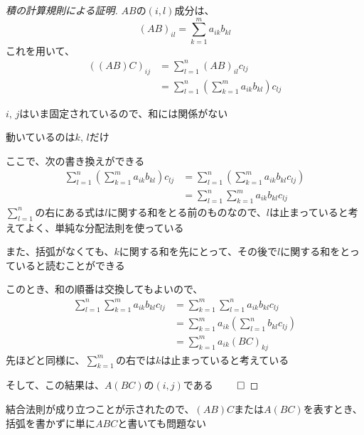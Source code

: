 \documentclass[../../../topic_linear-map]{subfiles}
\begin{document}
\begin{proof}[積の計算規則による証明]
  $AB$の$(i,l)$成分は、
  \begin{equation*}
    (AB)_{il} = \sum_{k=1}^m a_{ik} b_{kl}
  \end{equation*}
  これを用いて、
  \begin{align*}
    ((AB)C)_{ij} & = \sum_{l=1}^n (AB)_{il} c_{lj}                                 \\
                 & = \sum_{l=1}^n \left( \sum_{k=1}^m a_{ik} b_{kl} \right) c_{lj}
  \end{align*}

  $i,\,j$はいま固定されているので、和には関係がない

  動いているのは$k,\,l$だけ

  \br

  ここで、次の書き換えができる
  \begin{align*}
    \sum_{l=1}^n \left( \sum_{k=1}^m a_{ik} b_{kl} \right) c_{lj} & = \sum_{l=1}^n \left(\sum_{k=1}^m a_{ik} b_{kl} c_{lj} \right) \\
                                                                  & = \sum_{l=1}^n \sum_{k=1}^m a_{ik} b_{kl} c_{lj}
  \end{align*}
  $\displaystyle\sum_{l=1}^n$の右にある式は$l$に関する和をとる前のものなので、$l$は止まっていると考えてよく、単純な分配法則を使っている

  また、括弧がなくても、$k$に関する和を先にとって、その後で$l$に関する和をとっていると読むことができる

  \br

  このとき、和の順番は交換してもよいので、
  \begin{align*}
    \sum_{l=1}^n \sum_{k=1}^m a_{ik} b_{kl} c_{lj} & = \sum_{k=1}^m \sum_{l=1}^n a_{ik} b_{kl} c_{lj}                \\
                                                   & = \sum_{k=1}^m a_{ik} \left( \sum_{l=1}^n b_{kl} c_{lj} \right) \\
                                                   & = \sum_{k=1}^m a_{ik} (BC)_{kj}
  \end{align*}
  先ほどと同様に、$\displaystyle\sum_{k=1}^m$の右では$k$は止まっていると考えている

  そして、この結果は、$A(BC)$の$(i, j)$である $\qed$
\end{proof}

結合法則が成り立つことが示されたので、$(AB)C$または$A(BC)$を表すとき、括弧を書かずに単に$ABC$と書いても問題ない
\end{document}
